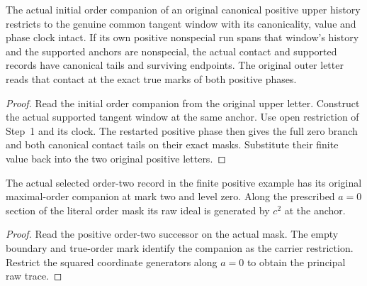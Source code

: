 \begin{theorem}
\label{hir:g1-original-upper-born-full-zero}
\leanok
The actual initial order companion of an original canonical
positive upper history restricts to the genuine common tangent
window with its canonicality, value and phase clock intact.
If its own positive nonspecial run spans that window's history
and the supported anchors are nonspecial, the actual contact
and supported records have canonical tails and surviving
endpoints. The original outer letter reads that contact at the
exact true marks of both positive phases.
\end{theorem}
\begin{proof}
Read the initial order companion from the original upper letter.
Construct the actual supported tangent window at the same anchor.
Use open restriction of Step~1 and its clock. The restarted
positive phase then gives the full zero branch and both canonical
contact tails on their exact masks. Substitute their finite value
back into the two original positive letters.
\end{proof}

\begin{theorem}
\label{hir:g1-recursive-born-order-two-companion}
\leanok
The actual selected order-two record in the finite positive
example has its original maximal-order companion at mark two
and level zero. Along the prescribed $a=0$ section of the
literal order mask its raw ideal is generated by $c^2$ at the
anchor.
\end{theorem}
\begin{proof}
Read the positive order-two successor on the actual mask.
The empty boundary and true-order mark identify the companion
as the carrier restriction. Restrict the squared coordinate
generators along $a=0$ to obtain the principal raw trace.
\end{proof}

